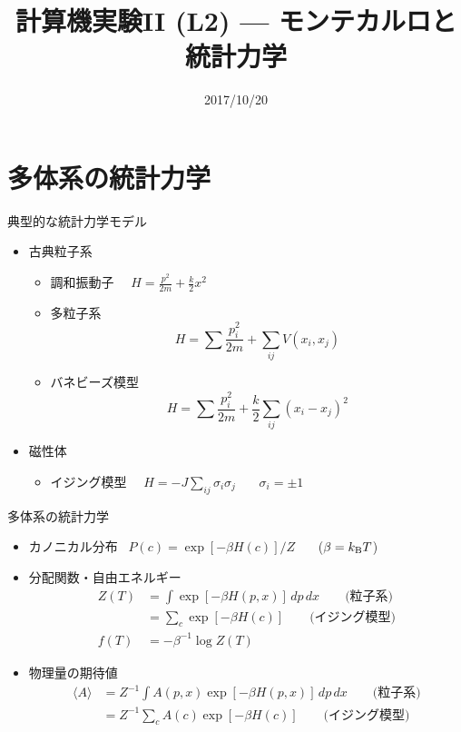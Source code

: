 \documentclass[dvipdfmx]{beamer}
\title{計算機実験II (L2) --- モンテカルロと統計力学}
\date{2017/10/20}
\begin{document}
\begin{frame}
  \titlepage
  \tableofcontents
\end{frame}

\section{多体系の統計力学}

\begin{frame}[t,fragile]{典型的な統計力学モデル}
  \begin{itemize}
  \item 古典粒子系
    \begin{itemize}
    \item 調和振動子 \ \ $\displaystyle H = \frac{p^2}{2m} + \frac{k}{2}x^2$
    \item 多粒子系
      \[
      H = \sum \frac{p_i^2}{2m} + \sum_{ij} V(x_i, x_j)
      \]
    \item バネビーズ模型
      \[
      H = \sum \frac{p_i^2}{2m} + \frac{k}{2} \sum_{ij} (x_i-x_j)^2
      \]
  \end{itemize}
  \item 磁性体
    \begin{itemize}
    \item イジング模型 \ \ $\displaystyle H = -J \sum_{ij} \sigma_i \sigma_j$ \ \ \ $\sigma_i = \pm 1$
    \end{itemize}
  \end{itemize}
\end{frame}

\begin{frame}[t,fragile]{多体系の統計力学}
  \begin{itemize}
    \setlength{\itemsep}{1em}
  \item カノニカル分布 \ $P(c) = \exp [- \beta H(c) ] / Z$ \ \ \ ($\beta = k_{\rm B} T$)
  \item 分配関数・自由エネルギー
    \begin{align*}
      Z(T) &= \int \exp [- \beta H(p,x) ] \, dp \, dx \qquad \text{(粒子系)} \\
      &= \sum_c \exp [- \beta H(c) ] \qquad \text{(イジング模型)} \\
      f(T) &= - \beta^{-1} \log Z(T)
    \end{align*}
  \item 物理量の期待値
    \begin{align*}
      \langle A \rangle &= Z^{-1} \int A(p,x) \exp [- \beta H(p,x) ] \, dp \, dx \qquad \text{(粒子系)} \\
      &= Z^{-1} \sum_c A(c) \exp [- \beta H(c) ] \qquad \text{(イジング模型)}
    \end{align*}
  \end{itemize}
\end{frame}
\end{document}
